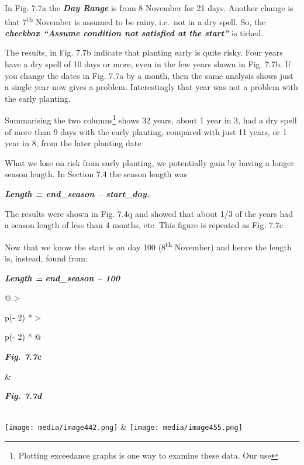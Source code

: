 \documentclass[
  letterpaper,
  DIV=11,
  numbers=noendperiod]{scrreprt}
\begin{document}
In Fig. 7.7a the \textbf{\emph{Day Range}} is from 8 November for 21
days. Another change is that 7\textsuperscript{th} November is assumed
to be rainy, i.e.~not in a dry spell. So, the \textbf{\emph{checkbox
``Assume condition not satisfied at the start''}} is ticked.

The results, in Fig. 7.7b indicate that planting early is quite risky.
Four years have a dry spell of 10 days or more, even in the few years
shown in Fig. 7.7b. If you change the dates in Fig. 7.7a by a month,
then the same analysis shows just a single year now gives a problem.
Interestingly that year was not a problem with the early planting.

Summarising the two columns\footnote{Plotting exceedance graphs is one
  way to examine these data. Our use} shows 32 years, about 1 year in 3,
had a dry spell of more than 9 days with the early planting, compared
with just 11 years, or 1 year in 8, from the later planting date

What we lose on risk from early planting, we potentially gain by having
a longer season length. In Section 7.4 the season length was

\textbf{\emph{Length = end\_season -- start\_doy.}}

The results were shown in Fig. 7.4q and showed that about 1/3 of the
years had a season length of less than 4 months, etc. This figure is
repeated as Fig. 7.7c

Now that we know the start is on day 100 (8\textsuperscript{th}
November) and hence the length is, instead, found from:

\textbf{\emph{Length =}} \textbf{\emph{end\_season -- 100}}

\begin{longtable}[]{@{}
  >{\raggedright\arraybackslash}p{(\columnwidth - 2\tabcolsep) * }
  >{\raggedright\arraybackslash}p{(\columnwidth - 2\tabcolsep) * }@{}}
\toprule\noalign{}
\begin{minipage}[b]{\linewidth}\raggedright
\textbf{\emph{Fig. 7.7c}}
\end{minipage} & \begin{minipage}[b]{\linewidth}\raggedright
\textbf{\emph{Fig. 7.7d}}
\end{minipage} \\
\midrule\noalign{}
\endhead
\bottomrule\noalign{}
\endlastfoot
\texttt{[image: media/image442.png]} &
\texttt{[image: media/image455.png]} \\
\end{longtable}
\end{document}
